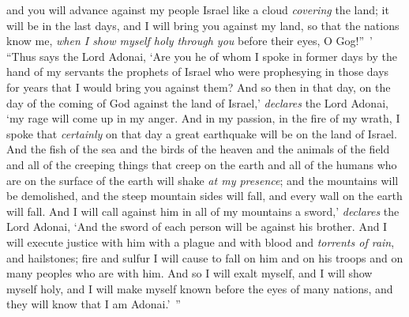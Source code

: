\begin{biblechapter}
\verse and you will advance against my people Israel like a cloud \textit{covering} the land; it will be in the last days, and I will bring you against my land, so that the nations know me, \textit{when I show myself holy through you} before their eyes, O Gog!” ’
\verse “Thus says the Lord Adonai, ‘Are you he of whom I spoke in former days by the hand of my servants the prophets of Israel who were prophesying in those days for years that I would bring you against them?
\verse And so then in that day, on the day of the coming of God against the land of Israel,’ \textit{declares} the Lord Adonai, ‘my rage will come up in my anger.
\verse And in my passion, in the fire of my wrath, I spoke that \textit{certainly} on that day a great earthquake will be on the land of Israel.
\verse And the fish of the sea and the birds of the heaven and the animals of the field and all of the creeping things that creep on the earth and all of the humans who are on the surface of the earth will shake \textit{at my presence}; and the mountains will be demolished, and the steep mountain sides will fall, and every wall on the earth will fall.
\verse And I will call against him in all of my mountains a sword,’ \textit{declares} the Lord Adonai, ‘And the sword of each person will be against his brother.
\verse And I will execute justice with him with a plague and with blood and \textit{torrents of rain}, and hailstones; fire and sulfur I will cause to fall on him and on his troops and on many peoples who are with him.
\verse And so I will exalt myself, and I will show myself holy, and I will make myself known before the eyes of many nations, and they will know that I am Adonai.’ ”
\end{biblechapter}

